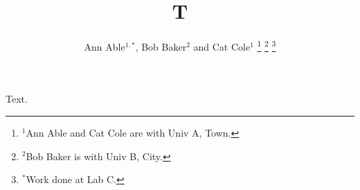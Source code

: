 \documentclass[conference]{IEEEtran}
\title{T}
\author{Ann Able$^{1,*}$, Bob Baker$^{2}$ and Cat Cole$^{1}$%
\thanks{$^{1}$Ann Able and Cat Cole are with Univ A, Town.}%
\thanks{$^{2}$Bob Baker is with Univ B, City.}%
\thanks{$^{*}$Work done at Lab C.}}
\begin{document}
\maketitle
Text.
\end{document}
